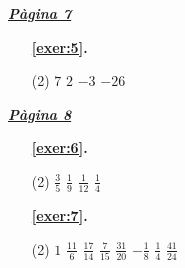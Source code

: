 
 \vspace{1cm} 
 

\vspace{0.3cm}


\hyperlink{page.7}{\textbf{\em Pàgina 7}}
\begin{enumerate}



 \item[\fontfamily{phv}\selectfont\color{blue}\textbf{\ref{exer:5}. }] \label{ans:5}
 \begin{tasks}[column-sep=1em, item-indent=1.3333em](2)
	 \task $7$
	 \task $2$
	 \task $-3$
	 \task $-26$
\end{tasks}
 \end{enumerate}
\vspace{0.3cm}


\hyperlink{page.8}{\textbf{\em Pàgina 8}}
\begin{enumerate}



 \item[\fontfamily{phv}\selectfont\color{blue}\textbf{\ref{exer:6}. }] \label{ans:6}
 \begin{tasks}[column-sep=1em, item-indent=1.3333em](2)
	 \task $\frac {3}{5}$
	 \task $\frac {1}{9}$
	 \task $\frac {1}{12}$
	 \task $\frac {1}{4}$
\end{tasks}
 \end{enumerate}
\begin{enumerate}



 \item[\fontfamily{phv}\selectfont\color{blue}\textbf{\ref{exer:7}. }] \label{ans:7}
 \begin{tasks}[column-sep=1em, item-indent=1.3333em](2)
	 \task $1$
	 \task $\frac {11}{6}$
	 \task $\frac {17}{14}$
	 \task $\frac {7}{15}$
	 \task $\frac {31}{20}$
	 \task $-\frac {1}{8}$
	 \task $\frac {1}{4}$
	 \task $\frac {41}{24}$
\end{tasks}
 \end{enumerate}
\vspace{0.3cm}


